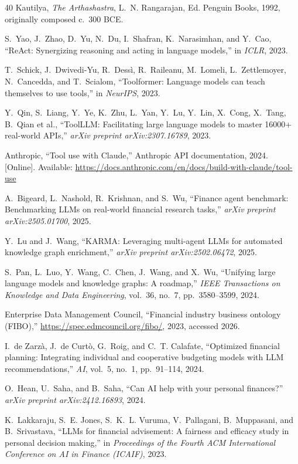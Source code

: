 \documentclass[conference]{IEEEtran}
\begin{document}
\begin{thebibliography}{40}
Kautilya, \emph{The Arthashastra}, L.~N. Rangarajan, Ed.
Penguin Books, 1992, originally composed c.\ 300 BCE.

S.~Yao, J.~Zhao, D.~Yu, N.~Du, I.~Shafran, K.~Narasimhan, and
Y.~Cao, ``{ReAct}: Synergizing reasoning and acting in language
models,'' in \emph{ICLR}, 2023.

T.~Schick, J.~Dwivedi-Yu, R.~Dess\`i, R.~Raileanu, M.~Lomeli,
L.~Zettlemoyer, N.~Cancedda, and T.~Scialom, ``Toolformer:
Language models can teach themselves to use tools,'' in
\emph{NeurIPS}, 2023.

Y.~Qin, S.~Liang, Y.~Ye, K.~Zhu, L.~Yan, Y.~Lu, Y.~Lin, X.~Cong,
X.~Tang, B.~Qian et al., ``ToolLLM: Facilitating large language
models to master 16000+ real-world APIs,''
\emph{arXiv preprint arXiv:2307.16789}, 2023.

Anthropic, ``Tool use with Claude,'' Anthropic API documentation,
2024. [Online]. Available:
\url{https://docs.anthropic.com/en/docs/build-with-claude/tool-use}

A.~Bigeard, L.~Nashold, R.~Krishnan, and S.~Wu, ``Finance agent
benchmark: Benchmarking LLMs on real-world financial research
tasks,'' \emph{arXiv preprint arXiv:2505.01700}, 2025.

Y.~Lu and J.~Wang, ``KARMA: Leveraging multi-agent LLMs for
automated knowledge graph enrichment,''
\emph{arXiv preprint arXiv:2502.06472}, 2025.

S.~Pan, L.~Luo, Y.~Wang, C.~Chen, J.~Wang, and X.~Wu, ``Unifying
large language models and knowledge graphs: A roadmap,''
\emph{IEEE Transactions on Knowledge and Data Engineering},
vol.~36, no.~7, pp.~3580--3599, 2024.

Enterprise Data Management Council, ``Financial industry business
ontology (FIBO),'' \url{https://spec.edmcouncil.org/fibo/}, 2023,
accessed 2026.

I.~de Zarz\`a, J.~de Curt\`o, G.~Roig, and C.~T. Calafate,
``Optimized financial planning: Integrating individual and
cooperative budgeting models with LLM recommendations,''
\emph{AI}, vol.~5, no.~1, pp.~91--114, 2024.

O.~Hean, U.~Saha, and B.~Saha, ``Can AI help with your personal
finances?'' \emph{arXiv preprint arXiv:2412.16893}, 2024.

K.~Lakkaraju, S.~E. Jones, S.~K.~L. Vuruma, V.~Pallagani,
B.~Muppasani, and B.~Srivastava, ``LLMs for financial advisement:
A fairness and efficacy study in personal decision making,'' in
\emph{Proceedings of the Fourth ACM International Conference on AI
in Finance (ICAIF)}, 2023.


\end{thebibliography}
\end{document}
